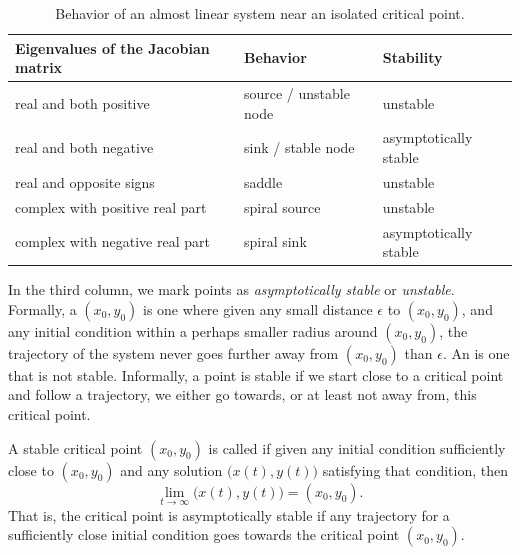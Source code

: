 \begin{table}[h!t]
\mybeginframe
\capstart
\begin{center}
\begin{tabular}{@{}lll@{}}
\toprule
Eigenvalues of the Jacobian matrix & Behavior & Stability \\
\midrule
real and both positive & source / unstable node & unstable \\
real and both negative & sink / stable node & asymptotically stable \\
real and opposite signs & saddle & unstable \\
complex with positive real part & spiral source & unstable \\
complex with negative real part & spiral sink & asymptotically stable \\
\bottomrule
\end{tabular}
\end{center}
\caption{Behavior of an almost linear system near an isolated critical
point.  \label{pln:behtab2}}
\myendframe
\end{table}

In the third column,
we mark points as \emph{asymptotically stable} or \emph{unstable}.  Formally, a
\emph{} $(x_0,y_0)$ is one where given any small distance $\epsilon$ to
$(x_0,y_0)$, and any initial condition within a perhaps smaller radius
around $(x_0,y_0)$, the trajectory
of the system never goes further away from $(x_0,y_0)$ than $\epsilon$.
An \emph{} is one that is not stable.
Informally, a point is stable if we start close to a critical point and
follow a trajectory, we either go towards, or at least not away
from,
this critical point.

A stable critical point $(x_0,y_0)$ is called \emph{} if
given any initial condition sufficiently close to $(x_0,y_0)$ and any
solution $\bigl( x(t), y(t) \bigr)$ satisfying that condition, then
\begin{equation*}
\lim_{t \to \infty} \bigl( x(t), y(t) \bigr) = (x_0,y_0) .
\end{equation*}
That is, the critical point is asymptotically stable
if any trajectory for a sufficiently close initial condition
goes towards the critical point $(x_0,y_0)$.


